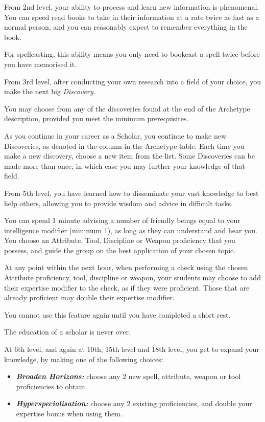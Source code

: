 {
From 2nd level, your ability to process and learn new information is phenomenal. You can speed read books to take in their information at a rate twice as fast as a normal person, and you can reasonably expect to remember everything in the book. 

For spellcasting, this ability means you only need to book\minus{}cast a spell twice before you have memorised it. 
}
{
From 3rd level, after conducting your own research into a field of your choice, you make the next big {\it Discovery}. 

You may choose from any of the discoveries found at the end of the Archetype description, provided you meet the minimum prerequisites. 

As you continue in your career as a Scholar, you continue to make new Discoveries, as denoted in the column in the Archetype table. Each time you make a new discovery, choose a new item from the list. Some Discoveries can be made more than once, in which case you may further your knowledge of that field. 
}
{
	From 5th level, you have learned how to disseminate your vast knowledge to best help others, allowing you to provide wisdom and advice in difficult tasks. 
	
	You can spend 1 minute advising a number of friendly beings equal to your intelligence modifier (minimum 1), as long as they can understand and hear you. You choose an Attribute, Tool, Discipline or Weapon proficiency that you possess, and guide the group on the best application of your chosen topic. 

	At any point within the next hour, when performing a check using the chosen Attribute proficiency, tool, discipline or weapon, your students may choose to add their expertise modifier to the check, as if they were proficient. Those that are already proficient may double their expertise modifier. 
	
	You cannot use this feature again until you have completed a short rest. 
	
}
{
	The education of a scholar is never over. 
	
	At 6th level, and again at 10th, 15th level and 18th level, you get to expand your knowledge, by making one of the following choices:
	
	\begin{itemize}
		\item \textbf{\textit{Broaden Horizons:}} choose any 2 new spell, attribute, weapon or tool proficiencies to obtain. 
			\item \textbf{\textit{Hyperspecialisation:}} choose any 2 existing proficiencies, and double your expertise bonus when using them. 
	\end{itemize}
}


